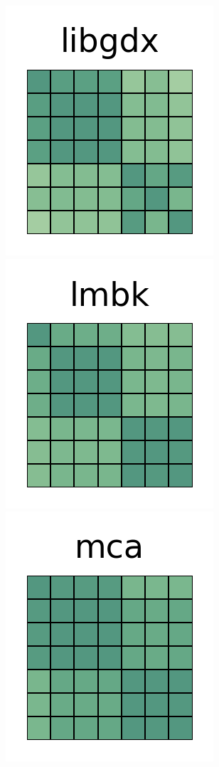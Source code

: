 \documentclass[10pt,conference]{IEEEtran}
\begin{document}
\begin{figure}[htb!]
 \includegraphics[width=\heatmapWidth, keepaspectratio]{correlations-classic/libgdx-grids.png}
 \includegraphics[width=\heatmapWidth, keepaspectratio]{correlations-classic/lombok-grids.png}
 \includegraphics[width=\heatmapWidth, keepaspectratio]{correlations-classic/material-components-android-grids.png} \\

\end{figure}
\end{document}
